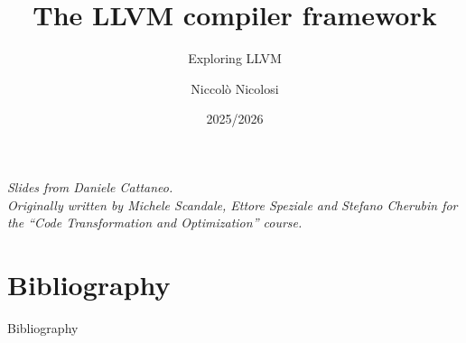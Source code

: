 

\author{Niccolò Nicolosi}
\date{2025/2026}
\title{The LLVM compiler framework}
\subtitle{Exploring LLVM}
\newcommand{\customdata}{Niccolò Nicolosi}






\begin{frame}
\maketitle
\begin{center}
\itshape\scriptsize
Slides from Daniele Cattaneo.\\
Originally written by
Michele Scandale, Ettore Speziale and Stefano Cherubin for the
``Code Transformation and Optimization'' course.
\end{center}
\end{frame}








\section{Bibliography}
\begin{frame}[allowframebreaks]{Bibliography}
\nocite{*}


\end{frame}

